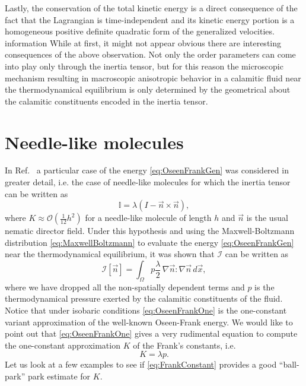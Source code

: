 \documentclass[%
 aip,
 amsmath,amssymb,
 reprint,%
]{revtex4-1}
\begin{document}
Lastly, the conservation of the total kinetic energy is a direct consequence of the fact that the Lagrangian is time-independent and its kinetic energy portion is a homogeneous positive definite quadratic form of the generalized velocities\cite{FM}.
information
While at first, it might not appear obvious there are interesting consequences of the above observation. Not only the order parameters can come into play only through the inertia tensor, but for this reason the microscopic mechanism resulting in macroscopic anisotropic behavior in a calamitic fluid near the thermodynamical equilibrium is only determined by the geometrical about the calamitic constituents encoded in the inertia tensor.
\section{Needle-like molecules}
In Ref.~ a particular case of the energy \eqref{eq:OseenFrankGen} was considered in greater detail, i.e. the case of needle-like molecules for which the inertia tensor can be written as
\begin{equation}
  \label{eq:InertiaTensor}
  \mathbb{I} = \lambda(I-\vec{n}\times \vec{n}),
\end{equation}
where $K\approx \mathcal{O}(\frac{1}{12}h^2)$ for a needle-like molecule of length $h$ and $\vec{n}$ is the usual nematic director field.
Under this hypothesis and using the Maxwell-Boltzmann distribution \eqref{eq:MaxwellBoltzmann} to evaluate the energy \eqref{eq:OseenFrankGen} near the thermodynamical equilibrium, it was shown\cite{FRZ23} that $\mathcal{I}$ can be written as
\begin{equation}
  \label{eq:OseenFrankOne}
  \mathcal{I}[\vec{n}]=\int_\Omega p\frac{\lambda}{2}\,\nabla\vec{n}:\nabla\vec{n}\,d\vec{x},
\end{equation}
where we have dropped all the non-spatially dependent terms and $p$ is the thermodynamical pressure exerted by the calamitic constituents of the fluid. Notice that under isobaric conditions \eqref{eq:OseenFrankOne} is the one-constant variant approximation of the well-known Oseen-Frank energy\cite{V}.
We would like to point out that \eqref{eq:OseenFrankOne} gives a very rudimental equation to compute the one-constant approximation $K$ of the Frank's constants, i.e.
\begin{equation}
  \label{eq:FrankConstant}
  K=\lambda p.
\end{equation}
Let us look at a few examples to see if \eqref{eq:FrankConstant} provides a good ``ball-park'' park estimate for $K$.
\end{document}
